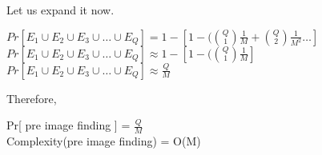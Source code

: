 \documentclass[11pt]{article}
\begin{document}
Let us expand it now. 
\begin{center}
    $Pr[E_1 \cup E_2 \cup E_3 \cup \dots \cup E_Q] = 1 - [1-(\binom{Q}{1} \frac{1}{M} + \binom{Q}{2} \frac{1}{M^2} \dots]$\\
    \vspace{3mm}
    $Pr[E_1 \cup E_2 \cup E_3 \cup \dots \cup E_Q] \approx  1 - [1-(\binom{Q}{1} \frac{1}{M}]$\\
    \vspace{3mm}
    $Pr[E_1 \cup E_2 \cup E_3 \cup \dots \cup E_Q] \approx \frac{Q}{M}$
\end{center}
Therefore, 
\begin{center}
    Pr[ pre image finding ] = $\frac{Q}{M}$\\
    \vspace{3mm}
    Complexity(pre image finding) = O(M)
\end{center}
\end{document}

